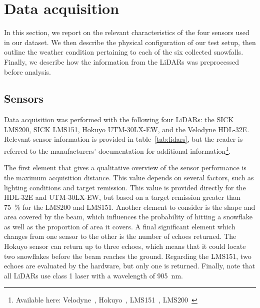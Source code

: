 \section{Data acquisition}
In this section, we report on the relevant characteristics of the four sensors used in our dataset. We then describe the physical configuration of our test setup, then outline the weather condition pertaining to each of the six collected snowfalls. Finally, we describe how the information from the LiDARs was preprocessed before analysis. 

\subsection{Sensors}

Data acquisition was performed with the following four LiDARs: the SICK LMS200, SICK LMS151, Hokuyo UTM-30LX-EW, and the Velodyne HDL-32E. Relevant sensor information is provided in table~\ref{tab:lidars}, but the reader is referred to the manufacturers' documentation for additional information\footnote{Available here: Velodyne~\cite{VelodyneManual}, Hokuyo~\cite{UTMDatasheet}, LMS151~\cite{LMS151Datasheet}, LMS200~\cite{LMS200Manual}}.

The first element that gives a qualitative overview of the sensor performance is the maximum acquisition distance. This value depends on several factors, such as lighting conditions and target remission. This value is provided directly for the HDL-32E and UTM-30LX-EW, but based on a target remission greater than \SI{75}{\percent} for the LMS200 and LMS151. Another element to consider is the shape and area covered by the beam, which influences the probability of hitting a snowflake as well as the proportion of area it covers. A final significant element which changes from one sensor to the other is the number of echoes returned. The Hokuyo sensor can return up to three echoes, which means that it could locate two snowflakes before the beam reaches the ground. Regarding the LMS151, two echoes are evaluated by the hardware, but only one is returned. Finally, note that all LiDARs use class 1 laser with a wavelength of \SI{905}{\nano\meter}.

